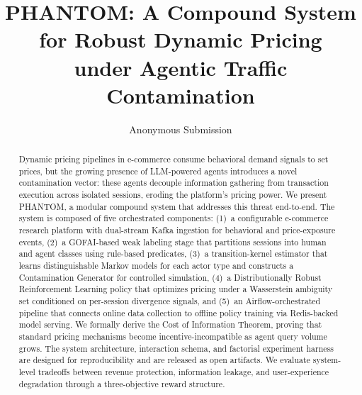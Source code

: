 \documentclass[sigconf]{acmart}
\begin{document}
\title{PHANTOM: A Compound System for Robust Dynamic Pricing\\under Agentic Traffic Contamination}

\author{Anonymous Submission}
\affiliation{}
\email{}

\begin{abstract}
Dynamic pricing pipelines in e-commerce consume behavioral demand signals to set prices, but the growing presence of LLM-powered agents introduces a novel contamination vector: these agents decouple information gathering from transaction execution across isolated sessions, eroding the platform's pricing power.
We present PHANTOM, a modular compound system that addresses this threat end-to-end. The system is composed of five orchestrated components: (1)~a configurable e-commerce research platform with dual-stream Kafka ingestion for behavioral and price-exposure events, (2)~a GOFAI-based weak labeling stage that partitions sessions into human and agent classes using rule-based predicates, (3)~a transition-kernel estimator that learns distinguishable Markov models for each actor type and constructs a Contamination Generator for controlled simulation, (4)~a Distributionally Robust Reinforcement Learning policy that optimizes pricing under a Wasserstein ambiguity set conditioned on per-session divergence signals, and (5)~an Airflow-orchestrated pipeline that connects online data collection to offline policy training via Redis-backed model serving.
We formally derive the Cost of Information Theorem, proving that standard pricing mechanisms become incentive-incompatible as agent query volume grows. The system architecture, interaction schema, and factorial experiment harness are designed for reproducibility and are released as open artifacts. We evaluate system-level tradeoffs between revenue protection, information leakage, and user-experience degradation through a three-objective reward structure.
\end{abstract}


\maketitle

\end{document}
